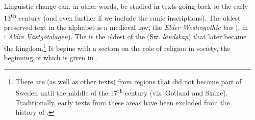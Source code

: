 \documentclass[output=paper]{langscibook}
\begin{document}
Linguistic change can, in other words, be studied in texts going back to the early 13\textsuperscript{th} century (and even further if we include the runic inscriptions). The oldest preserved  text in the  alphabet is a medieval law, the \textit{Elder Westrogothic law} (, in : \textit{Äldre Västgötalagen}). The  is the oldest of the  (Sw. \textit{landskap}) that later became the  kingdom.\footnote{There are  (as well as other texts) from regions that did not become part of Sweden until the middle of the 17\textsuperscript{th} century (viz. Gotland and Skåne). Traditionally, early texts from these areas have been excluded from the history of .} It begins with a section on the role of religion in society, the beginning of which is given in .
\end{document}
